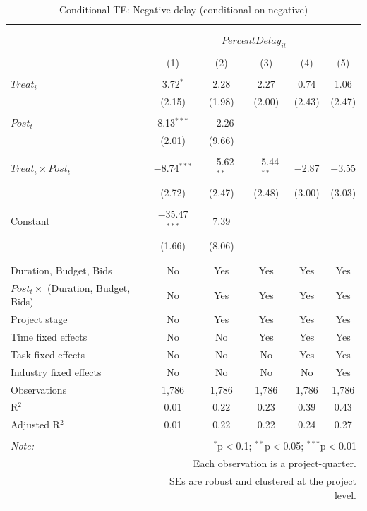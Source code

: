\documentclass[
]{article}
\begin{document}
\begin{table}[H] \centering 
  \caption{Conditional TE: Negative delay (conditional on negative)} 
  \label{} 
\small 
\begin{tabular}{@{\extracolsep{-2pt}}lccccc} 
\\[-1.8ex]\hline 
\hline \\[-1.8ex] 
\\[-1.8ex] & \multicolumn{5}{c}{$PercentDelay_{it}$} \\ 
\\[-1.8ex] & (1) & (2) & (3) & (4) & (5)\\ 
\hline \\[-1.8ex] 
 $Treat_i$ & 3.72$^{*}$ & 2.28 & 2.27 & 0.74 & 1.06 \\ 
  & (2.15) & (1.98) & (2.00) & (2.43) & (2.47) \\ 
  & & & & & \\ 
 $Post_t$ & 8.13$^{***}$ & $-$2.26 &  &  &  \\ 
  & (2.01) & (9.66) &  &  &  \\ 
  & & & & & \\ 
 $Treat_i \times Post_t$ & $-$8.74$^{***}$ & $-$5.62$^{**}$ & $-$5.44$^{**}$ & $-$2.87 & $-$3.55 \\ 
  & (2.72) & (2.47) & (2.48) & (3.00) & (3.03) \\ 
  & & & & & \\ 
 Constant & $-$35.47$^{***}$ & 7.39 &  &  &  \\ 
  & (1.66) & (8.06) &  &  &  \\ 
  & & & & & \\ 
\hline \\[-1.8ex] 
Duration, Budget, Bids & No & Yes & Yes & Yes & Yes \\ 
$Post_t \times$  (Duration, Budget, Bids) & No & Yes & Yes & Yes & Yes \\ 
Project stage & No & Yes & Yes & Yes & Yes \\ 
Time fixed effects & No & No & Yes & Yes & Yes \\ 
Task fixed effects & No & No & No & Yes & Yes \\ 
Industry fixed effects & No & No & No & No & Yes \\ 
Observations & 1,786 & 1,786 & 1,786 & 1,786 & 1,786 \\ 
R$^{2}$ & 0.01 & 0.22 & 0.23 & 0.39 & 0.43 \\ 
Adjusted R$^{2}$ & 0.01 & 0.22 & 0.22 & 0.24 & 0.27 \\ 
\hline 
\hline \\[-1.8ex] 
\textit{Note:}  & \multicolumn{5}{r}{$^{*}$p$<$0.1; $^{**}$p$<$0.05; $^{***}$p$<$0.01} \\ 
 & \multicolumn{5}{r}{Each observation is a project-quarter.} \\ 
 & \multicolumn{5}{r}{SEs are robust and clustered at the project level.} \\ 
\end{tabular} 
\end{table}
\end{document}
